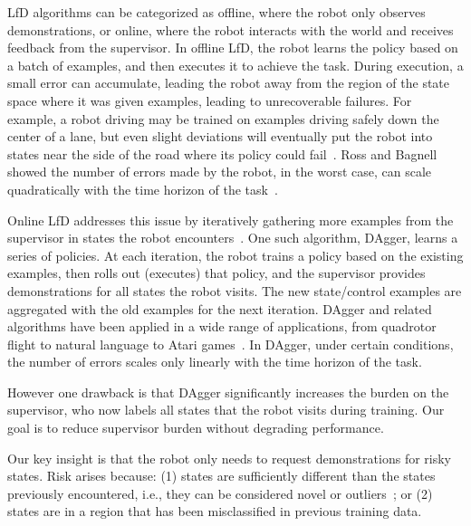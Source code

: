 \documentclass[10pt, conference]{ieeeconf}      %
\newcommand{\adnote}[1]{\ifthenelse{ \boolean{include-notes}}%
 {\textcolor{blue}{\textbf{AD: #1}}}{}}
\begin{document}
LfD algorithms can be categorized as offline, where the robot only observes demonstrations, or online, where the robot interacts with the world and receives feedback from the supervisor.
In offline LfD, the robot learns the policy based on a batch of examples, and then executes it to achieve the task.  During execution, a small error can accumulate, leading the robot away from the region of the state space where it was given examples, leading to unrecoverable failures.  For example, a robot driving may be trained on examples driving safely down the center of a lane, but even slight deviations will eventually put the robot into states near the side of the road where its policy could  fail~\cite{pomerleau1989alvinn}. Ross and Bagnell showed the number of errors made by the robot, in the worst case,  can scale quadratically with the time horizon of the task~\cite{ross2010efficient}.




Online LfD addresses this issue by iteratively gathering more examples from the supervisor in states the robot encounters~\cite{grollman2007dogged,ross2010efficient,ross2010reduction}. One such algorithm, DAgger, learns a series of policies. At each iteration, the robot trains a policy based on the existing examples, then rolls out (executes) that policy, and the supervisor provides demonstrations for all states the robot visits. The new state/control examples are aggregated with the old examples for the next iteration. DAgger and related algorithms have been applied in a wide range of applications, from quadrotor flight to natural language to Atari games~\cite{NIPS2014_5421,duvallet2013imitation,ross2013learning}. In DAgger, under certain conditions, the number of errors scales only linearly with the time horizon of the task\cite{ross2010reduction}.

However one drawback is that DAgger significantly increases the burden on the supervisor, who now labels all states that the robot visits during training.  Our goal is to reduce supervisor burden without degrading performance.

Our key insight is that the robot only needs to request demonstrations for risky states. Risk arises because:  (1) states are sufficiently different than the states previously encountered, i.e., they can be considered novel or outliers~\cite{hodge2004survey}; or (2) states are in a region that has been misclassified in previous training data.
\end{document}
